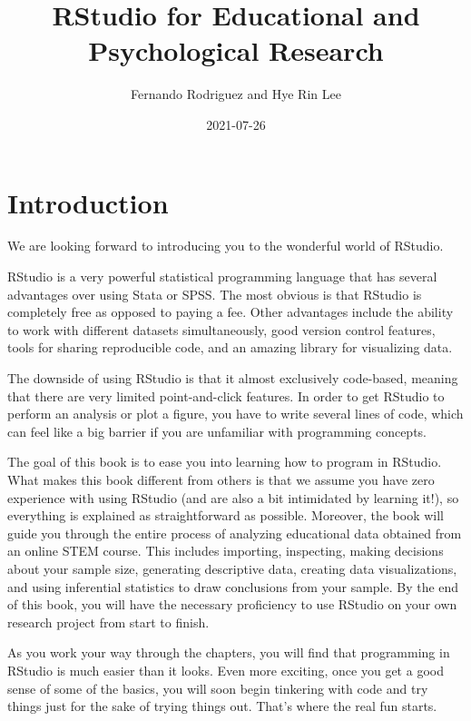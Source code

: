 \documentclass[
]{book}
\title{RStudio for Educational and Psychological Research}
\author{Fernando Rodriguez and Hye Rin Lee}
\date{2021-07-26}
\begin{document}
\maketitle

{
\setcounter{tocdepth}{1}
\tableofcontents
}
\hypertarget{introduction}{%
\chapter{Introduction}\label{introduction}}

We are looking forward to introducing you to the wonderful world of RStudio.

RStudio is a very powerful statistical programming language that has several advantages over using Stata or SPSS. The most obvious is that RStudio is completely free as opposed to paying a fee. Other advantages include the ability to work with different datasets simultaneously, good version control features, tools for sharing reproducible code, and an amazing library for visualizing data.

The downside of using RStudio is that it almost exclusively code-based, meaning that there are very limited point-and-click features. In order to get RStudio to perform an analysis or plot a figure, you have to write several lines of code, which can feel like a big barrier if you are unfamiliar with programming concepts.

The goal of this book is to ease you into learning how to program in RStudio. What makes this book different from others is that we assume you have zero experience with using RStudio (and are also a bit intimidated by learning it!), so everything is explained as straightforward as possible. Moreover, the book will guide you through the entire process of analyzing educational data obtained from an online STEM course. This includes importing, inspecting, making decisions about your sample size, generating descriptive data, creating data visualizations, and using inferential statistics to draw conclusions from your sample. By the end of this book, you will have the necessary proficiency to use RStudio on your own research project from start to finish.

As you work your way through the chapters, you will find that programming in RStudio is much easier than it looks. Even more exciting, once you get a good sense of some of the basics, you will soon begin tinkering with code and try things just for the sake of trying things out. That's where the real fun starts.
\end{document}
